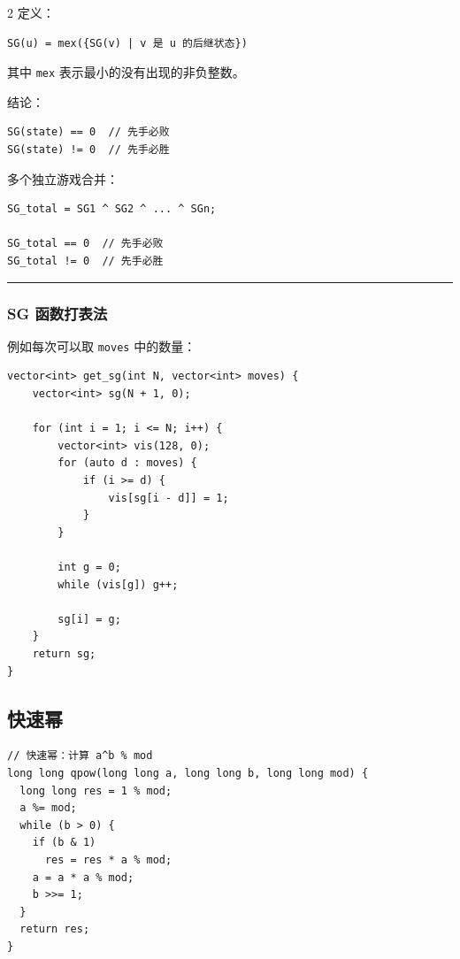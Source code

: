 \documentclass[10pt]{article}
\begin{document}
\begin{multicols*}{2}
定义： \par

\begin{verbatim}
SG(u) = mex({SG(v) | v 是 u 的后继状态})
\end{verbatim}


其中 \texttt{mex} 表示最小的没有出现的非负整数。 \par

结论： \par

\begin{verbatim}
SG(state) == 0  // 先手必败
SG(state) != 0  // 先手必胜
\end{verbatim}


多个独立游戏合并： \par

\begin{verbatim}
SG_total = SG1 ^ SG2 ^ ... ^ SGn;

SG_total == 0  // 先手必败
SG_total != 0  // 先手必胜
\end{verbatim}


\noindent\rule{\linewidth}{0.4pt}\par


\subsubsection{SG 函数打表法}


例如每次可以取 \texttt{moves} 中的数量： \par

\begin{verbatim}
vector<int> get_sg(int N, vector<int> moves) {
    vector<int> sg(N + 1, 0);

    for (int i = 1; i <= N; i++) {
        vector<int> vis(128, 0);
        for (auto d : moves) {
            if (i >= d) {
                vis[sg[i - d]] = 1;
            }
        }

        int g = 0;
        while (vis[g]) g++;

        sg[i] = g;
    }
    return sg;
}
\end{verbatim}




\subsection{快速幂}


\begin{verbatim}
// 快速幂：计算 a^b % mod
long long qpow(long long a, long long b, long long mod) {
  long long res = 1 % mod;
  a %= mod;
  while (b > 0) {
    if (b & 1)
      res = res * a % mod;
    a = a * a % mod;
    b >>= 1;
  }
  return res;
}


\end{verbatim}
\end{multicols*}
\end{document}
